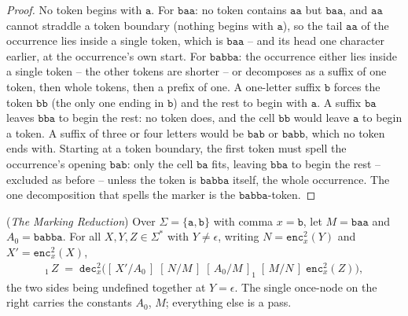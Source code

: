\documentclass[runningheads,envcountsect]{llncs}
\begin{document}
\begin{proof}
    No token begins with $\mathtt{a}$. For $\mathtt{baa}$: no token contains $\mathtt{aa}$ but $\mathtt{baa}$, and $\mathtt{aa}$ cannot straddle a token boundary (nothing begins with $\mathtt{a}$), so the tail $\mathtt{aa}$ of the occurrence lies inside a single token, which is $\mathtt{baa}$ -- and its head one character earlier, at the occurrence's own start. For $\mathtt{babba}$: the occurrence either lies inside a single token -- the other tokens are shorter -- or decomposes as a suffix of one token, then whole tokens, then a prefix of one. A one-letter suffix $\mathtt{b}$ forces the token $\mathtt{bb}$ (the only one ending in $\mathtt{b}$) and the rest to begin with $\mathtt{a}$. A suffix $\mathtt{ba}$ leaves $\mathtt{bba}$ to begin the rest: no token does, and the cell $\mathtt{bb}$ would leave $\mathtt{a}$ to begin a token. A suffix of three or four letters would be $\mathtt{bab}$ or $\mathtt{babb}$, which no token ends with. Starting at a token boundary, the first token must spell the occurrence's opening $\mathtt{bab}$: only the cell $\mathtt{ba}$ fits, leaving $\mathtt{bba}$ to begin the rest -- excluded as before -- unless the token is $\mathtt{babba}$ itself, the whole occurrence. The one decomposition that spells the marker is the $\mathtt{babba}$-token.
\end{proof}

\begin{theorem}
    (\emph{The Marking Reduction})
    \label{thm:marking}
    Over $\Sigma = \{\mathtt{a},\mathtt{b}\}$ with comma $x = \mathtt{b}$, let $M = \mathtt{baa}$ and $A_0 = \mathtt{babba}$. For all $X, Y, Z \in \Sigma^*$ with $Y \neq \epsilon$, writing $N = \mathtt{enc}^2_{x}(Y)$ and $X' = \mathtt{enc}^2_{x}(X)$,
    \begin{align}
        [\,X/Y\,]_1\,Z \;=\;
        \mathtt{dec}^2_{x}\Big(
        [\,X'/A_0\,]\;[\,N/M\,]\;[\,A_0/M\,]_1\;[\,M/N\,]\;
        \mathtt{enc}^2_{x}(Z)\Big),
        \label{eq:marking}
    \end{align}
    the two sides being undefined together at $Y = \epsilon$. The single once-node on the right carries the constants $A_0$, $M$; everything else is a pass.
\end{theorem}
\end{document}
